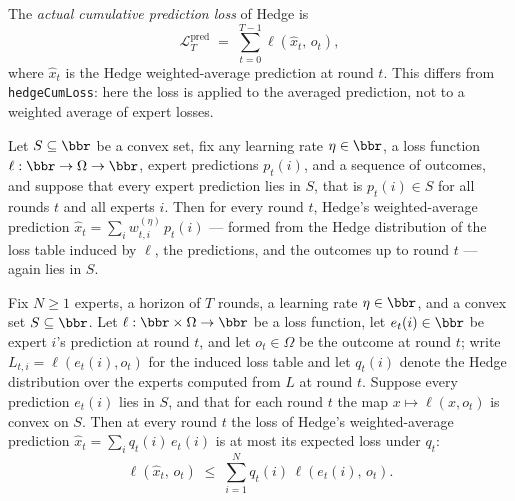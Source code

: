 \begin{definition}
\label{hedgePredictionCumLoss}
\leanok
{}
The \emph{actual cumulative prediction loss} of Hedge is
\[
  \mathcal{L}^{\mathrm{pred}}_T \;=\; \sum_{t=0}^{T-1} \ell\!\left(\widehat{x}_t,\, o_t\right),
\]
where $\widehat{x}_t$ is the Hedge weighted-average prediction at round $t$.  This
differs from \texttt{hedgeCumLoss}: here the loss is applied to the averaged
prediction, not to a weighted average of expert losses.
\end{definition}

\begin{lemma}
\label{hedgePrediction_mem}
\leanok
{}
Let $S \subseteq \bbr$ be a convex set, fix any learning rate $\eta \in \bbr$, a loss
function $\ell : \bbr \to \Omega \to \bbr$, expert predictions $p_t(i)$, and a sequence
of outcomes, and suppose that every expert prediction lies in $S$, that is $p_t(i) \in
S$ for all rounds $t$ and all experts $i$. Then for every round $t$, Hedge's
weighted-average prediction $\widehat{x}_t = \sum_{i} w^{(\eta)}_{t,i}\, p_t(i)$ —
formed from the Hedge distribution of the loss table induced by $\ell$, the predictions,
and the outcomes up to round $t$ — again lies in $S$.
\end{lemma}

\begin{lemma}
\label{hedgePrediction_loss_le_hedgeLoss}
\leanok
{}
Fix $N \ge 1$ experts, a horizon of $T$ rounds, a learning rate $\eta \in \bbr$, and a
convex set $S \subseteq \bbr$. Let $\ell : \bbr \times \Omega \to \bbr$ be a loss
function, let $e_t(i) \in \bbr$ be expert $i$'s prediction at round $t$, and let $o_t
\in \Omega$ be the outcome at round $t$; write $L_{t,i} = \ell(e_t(i), o_t)$ for the
induced loss table and let $q_t(i)$ denote the Hedge distribution over the experts
computed from $L$ at round $t$. Suppose every prediction $e_t(i)$ lies in $S$, and that
for each round $t$ the map $x \mapsto \ell(x, o_t)$ is convex on $S$. Then at every
round $t$ the loss of Hedge's weighted-average prediction $\widehat{x}_t = \sum_{i}
q_t(i)\, e_t(i)$ is at most its expected loss under $q_t$:
\[
  \ell\!\left(\widehat{x}_t,\, o_t\right)
  \;\le\;
  \sum_{i=1}^{N} q_t(i)\, \ell\!\left(e_t(i),\, o_t\right).
\]
\end{lemma}

